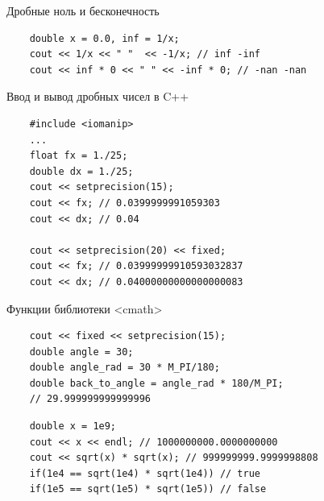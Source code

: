 \documentclass{beamer}
\begin{document}
\begin{frame}[fragile]{Дробные ноль и бесконечность}
    \begin{verbatim}
    double x = 0.0, inf = 1/x; 
    cout << 1/x << " "  << -1/x; // inf -inf
    cout << inf * 0 << " " << -inf * 0; // -nan -nan
    \end{verbatim}
\end{frame}

\begin{frame}[fragile]{Ввод и вывод дробных чисел в C++}
    \begin{verbatim}
    #include <iomanip>
    ...
    float fx = 1./25;
    double dx = 1./25;
    cout << setprecision(15);
    cout << fx; // 0.0399999991059303
    cout << dx; // 0.04

    cout << setprecision(20) << fixed;
    cout << fx; // 0.03999999910593032837
    cout << dx; // 0.04000000000000000083
    \end{verbatim}
\end{frame}

\begin{frame}[fragile]{Функции библиотеки <cmath>}
    \begin{verbatim}
    cout << fixed << setprecision(15);
    double angle = 30;
    double angle_rad = 30 * M_PI/180;
    double back_to_angle = angle_rad * 180/M_PI;
    // 29.999999999999996
    \end{verbatim}
        \pause
        
    \begin{verbatim}
    double x = 1e9;
    cout << x << endl; // 1000000000.0000000000
    cout << sqrt(x) * sqrt(x); // 999999999.9999998808
    if(1e4 == sqrt(1e4) * sqrt(1e4)) // true
    if(1e5 == sqrt(1e5) * sqrt(1e5)) // false
    \end{verbatim}
\end{frame}
\end{document}
